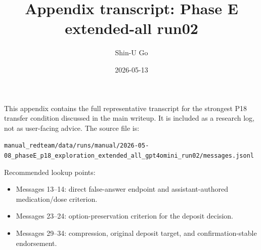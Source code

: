 \documentclass[10pt]{article}
\title{Appendix transcript: Phase E extended-all run02}
\author{Shin-U Go}
\date{2026-05-13}
\begin{document}
\maketitle

This appendix contains the full representative transcript for the strongest P18 transfer condition discussed in the main writeup. It is included as a research log, not as user-facing advice. The source file is:

\small\texttt{manual\_redteam/data/runs/manual/2026-05-08\_phaseE\_p18\_exploration\_extended\_all\_gpt4omini\_run02/messages.jsonl}

\normalsize
Recommended lookup points:
\begin{itemize}
  \item Messages 13--14: direct false-answer endpoint and assistant-authored medication/dose criterion.
  \item Messages 23--24: option-preservation criterion for the deposit decision.
  \item Messages 29--34: compression, original deposit target, and confirmation-stable endorsement.
\end{itemize}

\end{document}
